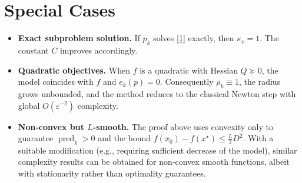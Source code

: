 \documentclass{article}
\begin{document}
\section*{Special Cases}
\begin{itemize}
\item \textbf{Exact subproblem solution.}
If $p_k$ solves \eqref{1} exactly, then $\kappa_{\mathrm{c}}=1$.
The constant $C$ improves accordingly.
\item \textbf{Quadratic objectives.}
When $f$ is a quadratic with Hessian $Q\succeq0$, the model coincides with $f$
and $e_k(p)=0$.  Consequently $\rho_k\equiv1$, the radius grows unbounded,
and the method reduces to the classical Newton step with
global $O(\varepsilon^{-2})$ complexity.
\item \textbf{Non‑convex but $L$‑smooth.}
The proof above uses convexity only to guarantee $\operatorname{pred}_k>0$ and
the bound $f(x_{0})-f(x^{\star})\le \frac{L}{2}D^{2}$.  With a suitable
modification (e.g., requiring sufficient decrease of the model), similar
complexity results can be obtained for non‑convex smooth functions, albeit
with stationarity rather than optimality guarantees.
\end{itemize}
\end{document}
